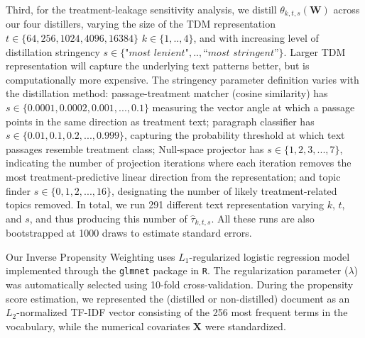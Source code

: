 \documentclass[11pt]{article}
\newcommand{\bX}{\bm{X}} %
\newcommand{\bW}{\bm{W}}  %
\begin{document}
Third, for the treatment-leakage sensitivity analysis, we distill $\theta_{k,t,s}(\bW)$ across our four distillers, varying the size of the TDM representation $t \in \{64, 256, 1024, 4096, 16384\}$ $k \in \{1,..,4\}$, and with increasing level of distillation stringency $s \in \{\textit{"most lenient"},..,\textit{``most stringent''}\}$. Larger TDM representation will capture the underlying text patterns better, but is computationally more expensive. The stringency parameter definition varies with the distillation method: passage-treatment matcher (cosine similarity) has $s \in \{0.0001, 0.0002, 0.001, ...,0.1\}$ measuring the vector angle at which a passage points in the same direction as treatment text;  paragraph classifier has $s \in \{0.01, 0.1, 0.2,...,0.999\}$, capturing the probability threshold at which text passages resemble treatment class;  Null-space projector has $s \in \{1,2,3,...,7\}$, indicating the number of projection iterations where each iteration removes the most treatment-predictive linear direction from the representation; and topic finder $s \in \{0,1,2,...,16\}$, designating the number of likely treatment-related topics removed. In total, we run 291 different text representation varying $k$, $t$, and $s$, and thus producing this number of $\widehat{\tau}_{k,t,s}$. All these runs are also bootstrapped at 1000 draws to estimate standard errors.

Our Inverse Propensity Weighting uses \(L_1\)-regularized logistic regression model implemented through the \texttt{glmnet} package in \texttt{R}. The regularization parameter (\(\lambda\)) was automatically selected using 10-fold cross-validation. During the propensity score estimation, we represented the (distilled or non-distilled) document as an \(L_2\)-normalized TF-IDF vector consisting of the 256 most frequent terms in the vocabulary, while the numerical covariates \(\bX\) were standardized.
\end{document}
